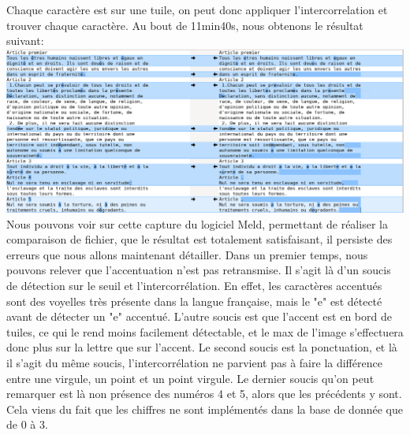 \documentclass[a4paper,12pt,titlepage]{report}
\begin{document}
	Chaque caractère est sur une tuile, on peut donc appliquer l'intercorrelation et trouver chaque caractère.
	Au bout de 11min40s, nous obtenons le résultat suivant:
	\includegraphics[scale=0.25]{../illus/diffDUDH.png}
	Nous pouvons voir sur cette capture du logiciel Meld, permettant de réaliser la comparaison de fichier, que le résultat est totalement satisfaisant, il persiste des erreurs que nous allons maintenant détailler.
	Dans un premier temps, nous pouvons relever que l'accentuation n'est pas retransmise. Il s'agit là d'un soucis de détection sur le seuil et l'intercorrélation. En effet, les caractères accentués sont des voyelles très présente dans la langue française, mais le "e" est détecté avant de détecter un "e" accentué. L'autre soucis est que l'accent est en bord de tuiles, ce qui le rend moins facilement détectable, et le max de l'image s'effectuera donc plus sur la lettre que sur l'accent.
	Le second soucis est la ponctuation, et là il s'agit du même soucis, l'intercorrélation ne parvient pas à faire la différence entre une virgule, un point et un point virgule.
	Le dernier soucis qu'on peut remarquer est là non présence des numéros 4 et 5, alors que les précédents y sont. Cela viens du fait que les chiffres ne sont implémentés dans la base de donnée que de 0 à 3.
	
\end{document}
